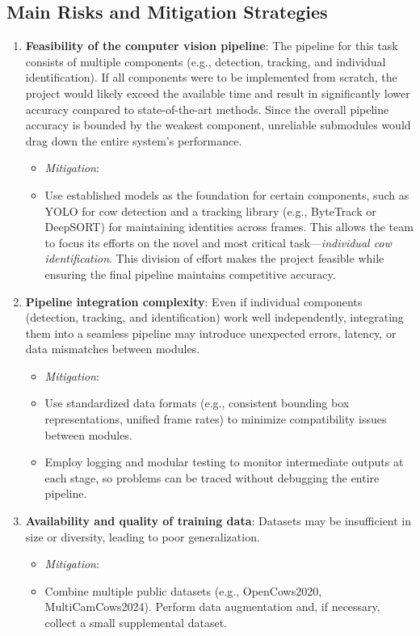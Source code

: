 \documentclass{article}
\begin{document}
\subsection*{Main Risks and Mitigation Strategies}
\begin{enumerate}
  \item \textbf{Feasibility of the computer vision pipeline}:
      The pipeline for this task consists of multiple components (e.g., detection, tracking, and individual identification). 
      If all components were to be implemented from scratch, the project would likely exceed the available time 
      and result in significantly lower accuracy compared to state-of-the-art methods. Since the overall pipeline accuracy 
      is bounded by the weakest component, unreliable submodules would drag down the entire system’s performance.  
      \begin{itemize}
        \item \emph{Mitigation}: 
            \item[]Use established models as the foundation for certain components, such as YOLO for cow detection 
              and a tracking library (e.g., ByteTrack or DeepSORT) for maintaining identities across frames. 
              This allows the team to focus its efforts on the novel and most critical task---\emph{individual cow identification}. 
              This division of effort makes the project feasible while ensuring the final pipeline maintains competitive accuracy.
      \end{itemize}

  \item \textbf{Pipeline integration complexity}:
      Even if individual components (detection, tracking, and identification) work well independently, integrating them into a seamless 
      pipeline may introduce unexpected errors, latency, or data mismatches between modules.  
      \begin{itemize}
        \item \emph{Mitigation}: 
          \item[] Use standardized data formats (e.g., consistent bounding box representations, unified frame rates) to minimize compatibility issues between modules.  
          \item[] Employ logging and modular testing to monitor intermediate outputs at each stage, so problems can be traced without debugging the entire pipeline.  
      \end{itemize}

  \item \textbf{Availability and quality of training data}:
        Datasets may be insufficient in size or diversity, leading to poor generalization.  
        \begin{itemize}
          \item \emph{Mitigation}: 
          \item[] Combine multiple public datasets (e.g., OpenCows2020, MultiCamCows2024). Perform data augmentation and, if necessary, collect a small supplemental dataset.
        \end{itemize}


\end{enumerate}
\end{document}
